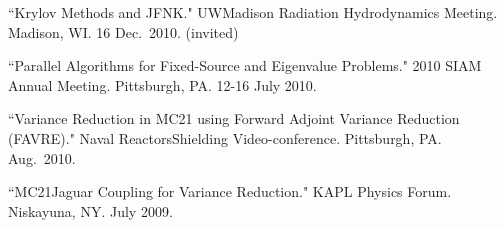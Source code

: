 \begin{bibsection}
\item ``Krylov Methods and JFNK." UW\textemdash Madison Radiation Hydrodynamics Meeting. Madison, WI. 16 Dec.\ 2010. (invited)

\item ``Parallel Algorithms for Fixed-Source and Eigenvalue Problems." 2010 SIAM Annual Meeting. Pittsburgh, PA. 12-16 July 2010.

\item ``Variance Reduction in MC21 using Forward Adjoint Variance Reduction (FAVRE)." Naval Reactors\textemdash Shielding Video-conference. Pittsburgh, PA. Aug.\ 2010.

\item ``MC21\textemdash Jaguar Coupling for Variance Reduction." KAPL Physics Forum. Niskayuna, NY. July 2009.

\end{bibsection}


